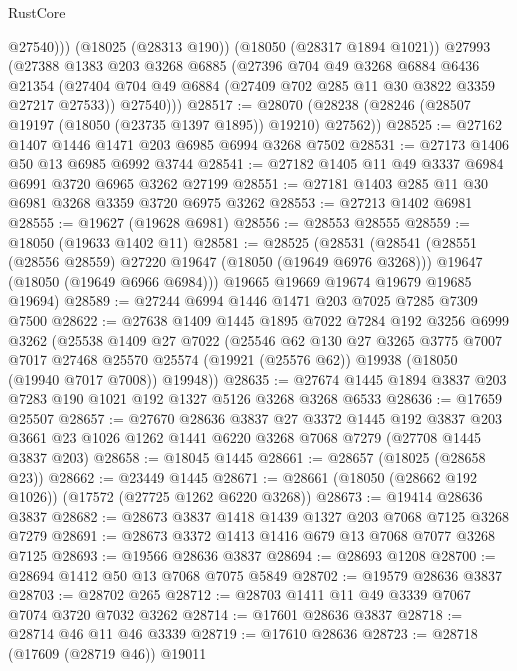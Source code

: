 \begin{lexlean}{RustCore}
\begin{coremodule}
            @27540)))
      (@18025 (@28313 @190))
      (@18050 (@28317 @1894 @1021))
      @27993
      (@27388
        @1383
        @203
        @3268
        @6885
        (@27396
          @704
          @49
          @3268
          @6884
          @6436
          @21354
          (@27404 @704 @49 @6884 (@27409 @702 @285 @11 @30 @3822 @3359 @27217 @27533))
          @27540)))
@28517 := @28070 (@28238 (@28246 (@28507 @19197 (@18050 (@23735 @1397 @1895)) @19210) @27562))
@28525 := @27162 @1407 @1446 @1471 @203 @6985 @6994 @3268 @7502
@28531 := @27173 @1406 @50 @13 @6985 @6992 @3744
@28541 := @27182 @1405 @11 @49 @3337 @6984 @6991 @3720 @6965 @3262 @27199
@28551 := @27181 @1403 @285 @11 @30 @6981 @3268 @3359 @3720 @6975 @3262
@28553 := @27213 @1402 @6981
@28555 := @19627 (@19628 @6981)
@28556 := @28553 @28555
@28559 := @18050 (@19633 @1402 @11)
@28581 := @28525
    (@28531
      (@28541
        (@28551 (@28556 @28559) @27220 @19647 (@18050 (@19649 @6976 @3268)))
        @19647
        (@18050 (@19649 @6966 @6984)))
      @19665
      @19669
      @19674
      @19679
      @19685
      @19694)
@28589 := @27244 @6994 @1446 @1471 @203 @7025 @7285 @7309 @7500
@28622 := @27638
    @1409
    @1445
    @1895
    @7022
    @7284
    @192
    @3256
    @6999
    @3262
    (@25538
      @1409
      @27
      @7022
      (@25546
        @62
        @130
        @27
        @3265
        @3775
        @7007
        @7017
        @27468
        @25570
        @25574
        (@19921 (@25576 @62))
        @19938
        (@18050 (@19940 @7017 @7008))
        @19948))
@28635 := @27674 @1445 @1894 @3837 @203 @7283 @190 @1021 @192 @1327 @5126 @3268 @3268 @6533
@28636 := @17659 @25507
@28657 := @27670
    @28636
    @3837
    @27
    @3372
    @1445
    @192
    @3837
    @203
    @3661
    @23
    @1026
    @1262
    @1441
    @6220
    @3268
    @7068
    @7279
    (@27708 @1445 @3837 @203)
@28658 := @18045 @1445
@28661 := @28657 (@18025 (@28658 @23))
@28662 := @23449 @1445
@28671 := @28661 (@18050 (@28662 @192 @1026)) (@17572 (@27725 @1262 @6220 @3268))
@28673 := @19414 @28636 @3837
@28682 := @28673 @3837 @1418 @1439 @1327 @203 @7068 @7125 @3268 @7279
@28691 := @28673 @3372 @1413 @1416 @679 @13 @7068 @7077 @3268 @7125
@28693 := @19566 @28636 @3837
@28694 := @28693 @1208
@28700 := @28694 @1412 @50 @13 @7068 @7075 @5849
@28702 := @19579 @28636 @3837
@28703 := @28702 @265
@28712 := @28703 @1411 @11 @49 @3339 @7067 @7074 @3720 @7032 @3262
@28714 := @17601 @28636 @3837
@28718 := @28714 @46 @11 @46 @3339
@28719 := @17610 @28636
@28723 := @28718 (@17609 (@28719 @46)) @19011

\end{coremodule}
\end{lexlean}
